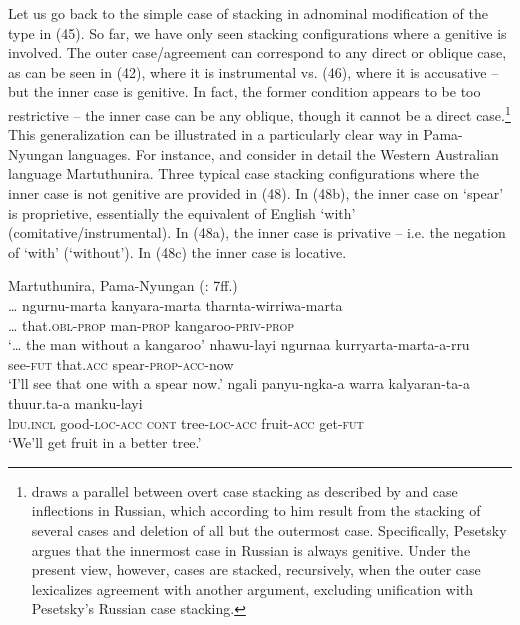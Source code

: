 \documentclass[output=paper]{langsci/langscibook}
\begin{document}
Let us go back to the simple case of stacking in adnominal modification of the type in (45). So far, we have only seen stacking configurations where a genitive is involved. The outer case\slash agreement can correspond to any direct or oblique case, as can be seen in (42), where it is instrumental vs. (46), where it is accusative – but the inner case is genitive. In fact, the former condition appears to be too restrictive – the inner case can be any oblique, though it cannot be a direct case.\footnote{\citet{Pesetsky2013} draws a parallel between overt case stacking as described by \citet{Richards2013} and case inflections in Russian, which according to him result from the stacking of several cases and deletion of all but the outermost case. Specifically, Pesetsky argues that the innermost case in Russian is always genitive. Under the present view, however, cases are stacked, recursively, when the outer case lexicalizes agreement with another argument, excluding unification with Pesetsky’s Russian case stacking.}  This generalization can be illustrated in a particularly clear way in Pama-Nyungan languages. For instance, \citet{Dench1988} and \citet{Dench1995} consider in detail the Western Australian language Martuthunira. Three typical case stacking configurations where the inner case is not genitive are provided in (48). In (48b), the inner case on ‘spear’ is proprietive, essentially the equivalent of English ‘with’ (comitative\slash instrumental). In (48a), the inner case is privative – i.e. the negation of ‘with’ (‘without’). In (48c) the inner case is locative. 

\ea%
    Martuthunira, Pama-Nyungan (\citealt{Dench1988}: 7ff.)\label{ex:manzini:48}\\
    \ea
    \gll … ngurnu-marta   kanyara-marta  tharnta-wirriwa-marta    \\
         … that.\textsc{obl-prop}   man-\textsc{prop}   kangaroo-\textsc{priv-prop}\\
    \glt ‘… the man without a kangaroo’
    \ex  
    \gll  nhawu-layi   ngurnaa  kurryarta-marta-a-rru    \\
         see-\textsc{fut}   that.\textsc{acc}   spear-\textsc{prop-acc}{}-now\\
    \glt ‘I'll see that one with a spear now.’
    \ex  
    \gll ngali   panyu-ngka-a   warra  kalyaran-ta-a   thuur.ta-a   manku-layi\\
         l\textsc{du.incl}   good-\textsc{loc-acc}  \textsc{cont}   tree-\textsc{loc-acc}   fruit-\textsc{acc}   get-\textsc{fut}\\
    \glt ‘We'll get fruit in a better tree.’ 
    \z
\z 
\end{document}
